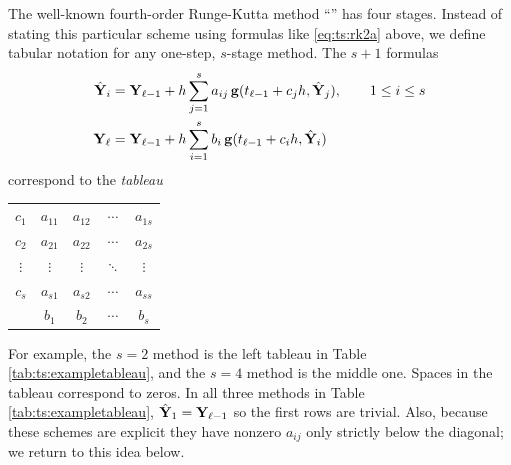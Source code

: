 The well-known fourth-order Runge-Kutta method ``\RKfour'' has four stages.  Instead of stating this particular scheme using formulas like \eqref{eq:ts:rk2a} above, we define tabular notation for any one-step, $s$-stage method.  The $s+1$ formulas
\begin{align}
\hat{\mathbf{Y}}_i &= \mathbf{Y}_{\ell-1} + h \sum_{j=1}^s a_{ij}\, \mathbf{g}(t_{\ell-1} + c_j h, \hat{\mathbf{Y}}_j), \qquad 1 \le i \le s \label{eq:ts:rkgeneral} \\
\mathbf{Y}_\ell  &= \mathbf{Y}_{\ell-1} + h \sum_{i=1}^s b_i\, \mathbf{g}(t_{\ell-1} + c_i h, \hat{\mathbf{Y}}_i) \notag
\end{align}
correspond to the \emph{tableau} \citep{Butcher2008}
\begin{center}
\begin{tabular}{c|cccc}
$c_1$    & $a_{11}$ & $a_{12}$ & $\cdots$ & $a_{1s}$ \\
$c_2$    & $a_{21}$ & $a_{22}$ & $\cdots$ & $a_{2s}$ \\
$\vdots$ & $\vdots$ & $\vdots$ & $\ddots$ & $\vdots$ \\
$c_s$    & $a_{s1}$ & $a_{s2}$ & $\cdots$ & $a_{ss}$ \\ \hline
         & $b_1$    & $b_2$    & $\cdots$ & $b_s$
\end{tabular}
\end{center}
For example, the $s=2$ method \RKtwoa is the left tableau in Table \ref{tab:ts:exampletableau}, and the $s=4$ method \RKfour is the middle one.  Spaces in the tableau correspond to zeros.  In all three methods in Table \ref{tab:ts:exampletableau}, $\hat{\mathbf{Y}}_1=\mathbf{Y}_{\ell-1}$ so the first rows are trivial.  Also, because these schemes are explicit they have nonzero $a_{ij}$ only strictly below the diagonal; we return to this idea below.

